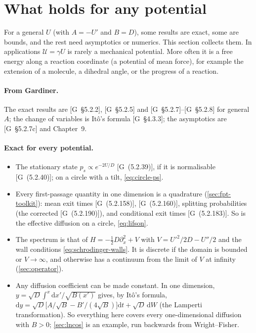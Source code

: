 \documentclass[11pt]{article}
\numberwithin{equation}{section}
\newcommand{\dd}{\mathrm{d}}
\newcommand{\G}[1]{[G~(#1)]}
\newcommand{\Gs}[1]{[G~\S#1]}
\begin{document}
\section{What holds for any potential}
\label{sec:general}

For a general $U$ (with $A=-U'$ and $B=D$), some results are exact, some are bounds, and the rest need asymptotics
or numerics. This section collects them. In applications $\mathcal U=\gamma U$ is rarely a mechanical potential.
More often it is a free energy along a reaction coordinate (a potential of mean force), for example the extension
of a molecule, a dihedral angle, or the progress of a reaction.

\paragraph{From Gardiner.} The exact results are \Gs{5.2.2}, \Gs{5.2.5} and \Gs{5.2.7}--\Gs{5.2.8} for general $A$;
the change of variables is Itô's formula \Gs{4.3.3}; the asymptotics are \Gs{5.2.7c} and Chapter~9.

\paragraph{Exact for every potential.}
\begin{itemize}
  \item The stationary state $p_s\propto e^{-2U/D}$ \G{5.2.39}, if it is normalisable \G{5.2.40}; on a circle with a
        tilt, \cref{eq:circle-ps}.
  \item Every first-passage quantity in one dimension is a quadrature (\cref{sec:fpt-toolkit}): mean exit times
        \G{5.2.158}, \G{5.2.160}, splitting probabilities (the corrected \G{5.2.190}), and conditional exit times
        \G{5.2.183}. So is the effective diffusion on a circle, \cref{eq:lifson}.
  \item The spectrum is that of $H=-\frac12D\partial_x^2+V$ with $V=U'^2/2D-U''/2$ and the wall conditions
        \cref{eq:schrodinger-walls}. It is discrete if the domain is bounded or $V\to\infty$, and otherwise has a
        continuum from the limit of $V$ at infinity (\cref{sec:operator}).
  \item Any diffusion coefficient can be made constant. In one dimension, $y=\sqrt D\int^x\dd x'/\sqrt{B(x')}$
        gives, by Itô's formula, $\dd y=\sqrt D\bigl[A/\sqrt B-B'/(4\sqrt B)\bigr]\dd t+\sqrt D\,\dd W$ (the Lamperti
        transformation). So everything here covers every one-dimensional diffusion with $B>0$;
        \cref{sec:lncos} is an example, run backwards from Wright--Fisher.
\end{itemize}
\end{document}
